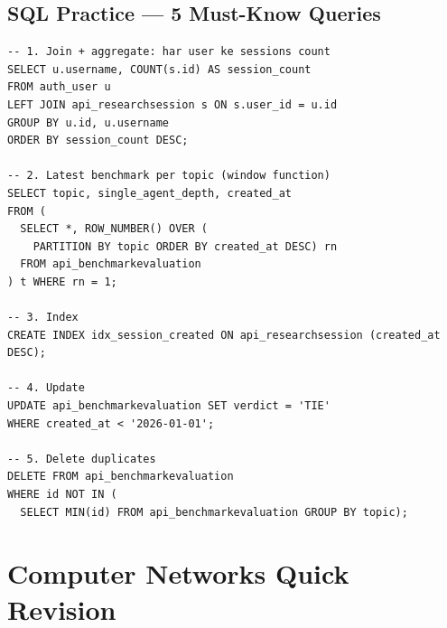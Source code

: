 \subsection{SQL Practice --- 5 Must-Know Queries}

\begin{codestorybox}
\begin{lstlisting}[style=pythonstyle, caption={SQL essentials}]
-- 1. Join + aggregate: har user ke sessions count
SELECT u.username, COUNT(s.id) AS session_count
FROM auth_user u
LEFT JOIN api_researchsession s ON s.user_id = u.id
GROUP BY u.id, u.username
ORDER BY session_count DESC;

-- 2. Latest benchmark per topic (window function)
SELECT topic, single_agent_depth, created_at
FROM (
  SELECT *, ROW_NUMBER() OVER (
    PARTITION BY topic ORDER BY created_at DESC) rn
  FROM api_benchmarkevaluation
) t WHERE rn = 1;

-- 3. Index
CREATE INDEX idx_session_created ON api_researchsession (created_at DESC);

-- 4. Update
UPDATE api_benchmarkevaluation SET verdict = 'TIE'
WHERE created_at < '2026-01-01';

-- 5. Delete duplicates
DELETE FROM api_benchmarkevaluation
WHERE id NOT IN (
  SELECT MIN(id) FROM api_benchmarkevaluation GROUP BY topic);
\end{lstlisting}
\end{codestorybox}

\section{Computer Networks Quick Revision}

